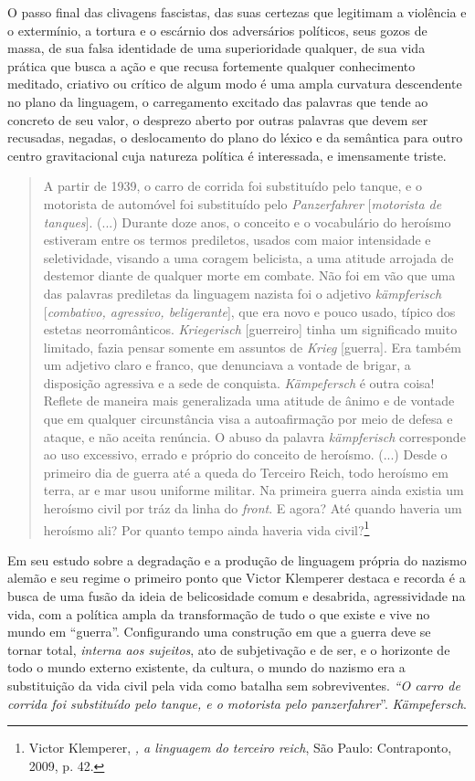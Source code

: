 O passo final das clivagens fascistas, das suas certezas que legitimam a
violência e o extermínio, a tortura e o escárnio dos adversários
políticos, seus gozos de massa, de sua falsa identidade de uma
superioridade qualquer, de sua vida prática que busca a ação e que
recusa fortemente qualquer conhecimento meditado, criativo ou crítico de
algum modo é uma ampla curvatura descendente no plano da linguagem, o
carregamento excitado das palavras que tende ao concreto de seu valor, o
desprezo aberto por outras palavras que devem ser recusadas, negadas, o
deslocamento do plano do léxico e da semântica para outro centro
gravitacional cuja natureza política é interessada, e imensamente
triste.

\begin{quote}
A partir de 1939, o carro de corrida foi substituído pelo tanque, e o
motorista de automóvel foi substituído pelo \emph{Panzerfahrer}
{[}\emph{motorista de tanques}{]}. (...) Durante doze anos, o conceito e
o vocabulário do heroísmo estiveram entre os termos prediletos, usados
com maior intensidade e seletividade, visando a uma coragem belicista, a
uma atitude arrojada de destemor diante de qualquer morte em combate.
Não foi em vão que uma das palavras prediletas da linguagem nazista foi
o adjetivo \emph{kämpferisch} {[}\emph{combativo, agressivo,
beligerante}{]}, que era novo e pouco usado, típico dos estetas
neorromânticos. \emph{Kriegerisch} {[}guerreiro{]} tinha um significado
muito limitado, fazia pensar somente em assuntos de \emph{Krieg}
{[}guerra{]}. Era também um adjetivo claro e franco, que denunciava a
vontade de brigar, a disposição agressiva e a sede de conquista.
\emph{Kämpefersch} é outra coisa! Reflete de maneira mais generalizada
uma atitude de ânimo e de vontade que em qualquer circunstância visa a
autoafirmação por meio de defesa e ataque, e não aceita renúncia. O
abuso da palavra \emph{kämpferisch} corresponde ao uso excessivo, errado
e próprio do conceito de heroísmo. (...) Desde o primeiro dia de guerra
até a queda do Terceiro Reich, todo heroísmo em terra, ar e mar usou
uniforme militar. Na primeira guerra ainda existia um heroísmo civil por
tráz da linha do \emph{front}. E agora? Até quando haveria um heroísmo
ali? Por quanto tempo ainda haveria vida civil?\footnote{Victor
  Klemperer, \emph{, a linguagem do terceiro reich}, São Paulo:
  Contraponto, 2009, p. 42.}
  \end{quote}

Em seu estudo sobre a degradação e a produção de linguagem própria do
nazismo alemão e seu regime o primeiro ponto que Victor Klemperer
destaca e recorda é a busca de uma fusão da ideia de belicosidade comum
e desabrida, agressividade na vida, com a política ampla da
transformação de tudo o que existe e vive no mundo em ``guerra''.
Configurando uma construção em que a guerra deve se tornar total,
\emph{interna aos sujeitos}, ato de subjetivação e de ser, e o horizonte
de todo o mundo externo existente, da cultura, o mundo do nazismo era a
substituição da vida civil pela vida como batalha sem sobreviventes.
\emph{``O carro de corrida foi substituído pelo tanque, e o motorista
pelo panzerfahrer}''. \emph{Kämpefersch}.

